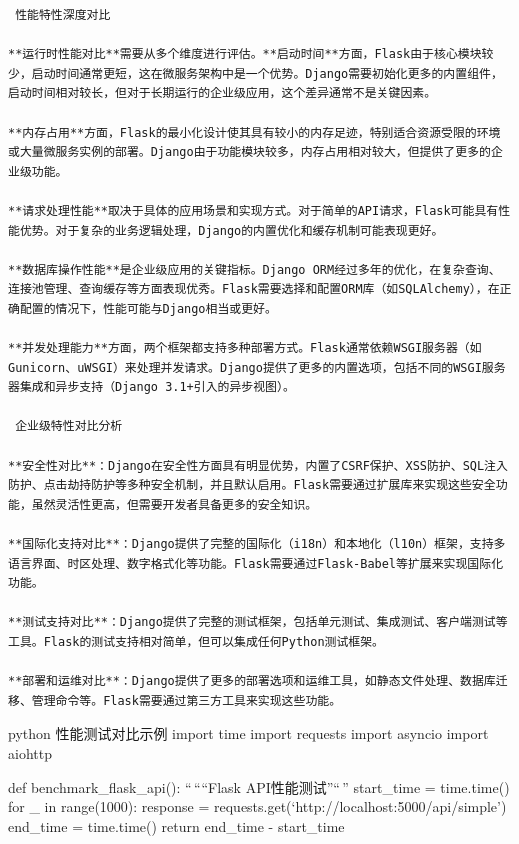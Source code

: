 \begin{lstlisting}
 性能特性深度对比

**运行时性能对比**需要从多个维度进行评估。**启动时间**方面，Flask由于核心模块较少，启动时间通常更短，这在微服务架构中是一个优势。Django需要初始化更多的内置组件，启动时间相对较长，但对于长期运行的企业级应用，这个差异通常不是关键因素。

**内存占用**方面，Flask的最小化设计使其具有较小的内存足迹，特别适合资源受限的环境或大量微服务实例的部署。Django由于功能模块较多，内存占用相对较大，但提供了更多的企业级功能。

**请求处理性能**取决于具体的应用场景和实现方式。对于简单的API请求，Flask可能具有性能优势。对于复杂的业务逻辑处理，Django的内置优化和缓存机制可能表现更好。

**数据库操作性能**是企业级应用的关键指标。Django ORM经过多年的优化，在复杂查询、连接池管理、查询缓存等方面表现优秀。Flask需要选择和配置ORM库（如SQLAlchemy），在正确配置的情况下，性能可能与Django相当或更好。

**并发处理能力**方面，两个框架都支持多种部署方式。Flask通常依赖WSGI服务器（如Gunicorn、uWSGI）来处理并发请求。Django提供了更多的内置选项，包括不同的WSGI服务器集成和异步支持（Django 3.1+引入的异步视图）。

 企业级特性对比分析

**安全性对比**：Django在安全性方面具有明显优势，内置了CSRF保护、XSS防护、SQL注入防护、点击劫持防护等多种安全机制，并且默认启用。Flask需要通过扩展库来实现这些安全功能，虽然灵活性更高，但需要开发者具备更多的安全知识。

**国际化支持对比**：Django提供了完整的国际化（i18n）和本地化（l10n）框架，支持多语言界面、时区处理、数字格式化等功能。Flask需要通过Flask-Babel等扩展来实现国际化功能。

**测试支持对比**：Django提供了完整的测试框架，包括单元测试、集成测试、客户端测试等工具。Flask的测试支持相对简单，但可以集成任何Python测试框架。

**部署和运维对比**：Django提供了更多的部署选项和运维工具，如静态文件处理、数据库迁移、管理命令等。Flask需要通过第三方工具来实现这些功能。
\end{lstlisting}

python  性能测试对比示例 import time import requests import asyncio import aiohttp

def benchmark\_flask\_api(): ``\,````Flask API性能测试''``\,'' start\_time = time.time() for \_ in range(1000): response = requests.get(`http://localhost:5000/api/simple') end\_time = time.time() return end\_time - start\_time


